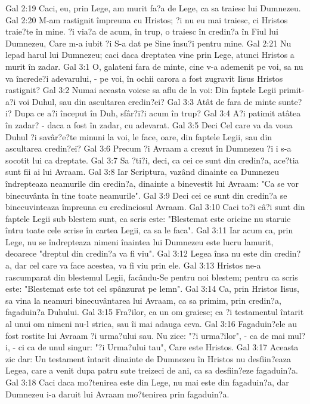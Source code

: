 Gal 2:19  Caci, eu, prin Lege, am murit fa?a de Lege, ca sa traiesc lui Dumnezeu.
Gal 2:20  M-am rastignit împreuna cu Hristos; ?i nu eu mai traiesc, ci Hristos traie?te în mine. ?i via?a de acum, în trup, o traiesc în credin?a în Fiul lui Dumnezeu, Care m-a iubit ?i S-a dat pe Sine însu?i pentru mine.
Gal 2:21  Nu lepad harul lui Dumnezeu; caci daca dreptatea vine prin Lege, atunci Hristos a murit în zadar.
Gal 3:1  O, galateni fara de minte, cine v-a ademenit pe voi, sa nu va încrede?i adevarului, - pe voi, în ochii carora a fost zugravit Iisus Hristos rastignit?
Gal 3:2  Numai aceasta voiesc sa aflu de la voi: Din faptele Legii primit-a?i voi Duhul, sau din ascultarea credin?ei?
Gal 3:3  Atât de fara de minte sunte?i? Dupa ce a?i început în Duh, sfâr?i?i acum în trup?
Gal 3:4  A?i patimit atâtea în zadar? - daca a fost în zadar, cu adevarat.
Gal 3:5  Deci Cel care va da voua Duhul ?i savâr?e?te minuni la voi, le face, oare, din faptele Legii, sau din ascultarea credin?ei?
Gal 3:6  Precum ?i Avraam a crezut în Dumnezeu ?i i s-a socotit lui ca dreptate.
Gal 3:7  Sa ?ti?i, deci, ca cei ce sunt din credin?a, ace?tia sunt fii ai lui Avraam.
Gal 3:8  Iar Scriptura, vazând dinainte ca Dumnezeu îndrepteaza neamurile din credin?a, dinainte a binevestit lui Avraam: "Ca se vor binecuvânta în tine toate neamurile".
Gal 3:9  Deci cei ce sunt din credin?a se binecuvinteaza împreuna cu credinciosul Avraam.
Gal 3:10  Caci to?i câ?i sunt din faptele Legii sub blestem sunt, ca scris este: "Blestemat este oricine nu staruie întru toate cele scrise în cartea Legii, ca sa le faca".
Gal 3:11  Iar acum ca, prin Lege, nu se îndrepteaza nimeni înaintea lui Dumnezeu este lucru lamurit, deoarece "dreptul din credin?a va fi viu".
Gal 3:12  Legea însa nu este din credin?a, dar cel care va face acestea, va fi viu prin ele.
Gal 3:13  Hristos ne-a rascumparat din blestemul Legii, facându-Se pentru noi blestem; pentru ca scris este: "Blestemat este tot cel spânzurat pe lemn".
Gal 3:14  Ca, prin Hristos Iisus, sa vina la neamuri binecuvântarea lui Avraam, ca sa primim, prin credin?a, fagaduin?a Duhului.
Gal 3:15  Fra?ilor, ca un om graiesc; ca ?i testamentul întarit al unui om nimeni nu-l strica, sau îi mai adauga ceva.
Gal 3:16  Fagaduin?ele au fost rostite lui Avraam ?i urma?ului sau. Nu zice: "?i urma?ilor", - ca de mai mul?i, - ci ca de unul singur: "?i Urma?ului tau", Care este Hristos.
Gal 3:17  Aceasta zic dar: Un testament întarit dinainte de Dumnezeu în Hristos nu desfiin?eaza Legea, care a venit dupa patru sute treizeci de ani, ca sa desfiin?eze fagaduin?a.
Gal 3:18  Caci daca mo?tenirea este din Lege, nu mai este din fagaduin?a, dar Dumnezeu i-a daruit lui Avraam mo?tenirea prin fagaduin?a.
